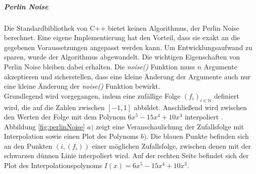 \documentclass[11pt,a4paper]{article}
\begin{document}
\subparagraph{Perlin Noise}
Die Standardbibliothek von C++ bietet keinen Algorithmus, der Perlin Noise berechnet. Eine eigene Implementierung hat den Vorteil, dass sie exakt an die gegebenen Voraussetzungen angepasst werden kann. Um Entwicklungsaufwand zu sparen, wurde der Algorithmus abgewandelt. Die wichtigen Eigenschaften von Perlin Noise bleiben dabei erhalten. Die \textit{noise()} Funktion muss $n$ Argumente akzeptieren und sicherstellen, dass eine kleine Änderung der Argumente auch nur eine kleine Änderung der \textit{noise()} Funktion bewirkt.\\
Grundlegend wird vorgegangen, indem eine zufällige Folge $\left(f_i\right)_{i \in \mathbb{N}}$ definiert wird, die auf die Zahlen zwischen $[-1, 1]$ abbildet.
Anschließend wird zwischen den Werten der Folge mit dem Polynom $6x^5-15x^4+10x^3$ interpoliert \cite[S. 2]{bcc7190da8e90284b4e790817b8eed4ee3ea6cffbe5a23ef07a000ca5628ffbc}.\\
Abbildung \ref{fig:perlinNoise} $a)$ zeigt eine Veranschaulichung der Zufallsfolge mit Interpolation sowie einen Plot des Polynoms $b)$. Die blauen Punkte befinden sich an den Punkten $\left(i, \left(f_i\right)\right)$ einer möglichen Zufallsfolge, zwischen denen mit der schwarzen dünnen Linie interpoliert wird. Auf der rechten Seite befindet sich der Plot des Interpolationspolynoms $I(x) = 6x^5-15x^4+10x^3$.
\end{document}

